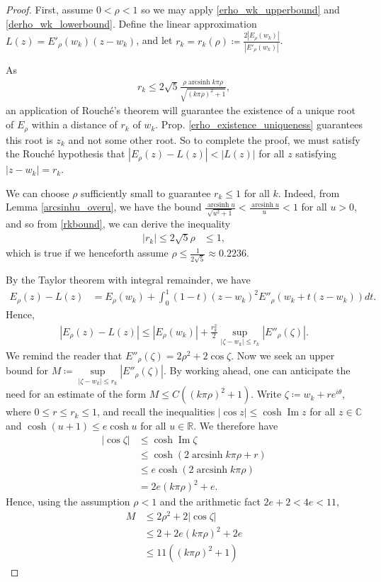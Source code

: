 \documentclass{amsart}
\theoremstyle{plain}
\numberwithin{theorem}{section}
\DeclareMathOperator{\arcsinh}{arcsinh}
\DeclareMathOperator{\Imz}{Im}
\theoremstyle{definition}
\theoremstyle{remark}
\theoremstyle{brakets}
\newcommand{\R}{\mathbb{R}}
\newcommand{\C}{\mathbb{C}}
\begin{document}
\begin{proof}
First, assume $0 < \rho < 1$ so we may apply \eqref{erho_wk_upperbound} and \eqref{derho_wk_lowerbound}. Define the linear approximation $L(z) = E'_\rho(w_k)(z-w_k)$, and let $r_k = r_k(\rho) \coloneq \frac{2|E_\rho(w_k)|}{|E'_\rho(w_k)|}$.

As 
\begin{align}
    r_k \leq 2\sqrt{5} \frac{\rho \arcsinh k \pi\rho}{\sqrt{(k\pi\rho)^2 + 1}}, \label{rkbound}
\end{align}
an application of Rouch\'e's theorem will guarantee the existence of a unique root of $E_\rho$ within a distance of $r_k$ of $w_k$. Prop. \ref{erho_existence_uniqueness} guarantees this root is $z_k$ and not some other root. So to complete the proof, we must satisfy the Rouch\'e hypothesis that $|E_\rho(z) - L(z) | < |L(z)|$ for all $z$ satisfying $|z-w_k| = r_k$.

We can choose $\rho$ sufficiently small to guarantee $r_k \leq 1$ for all $k$. Indeed, from Lemma \ref{arcsinhu_overu}, we have the bound $\frac{\arcsinh u}{\sqrt{u^2 + 1}} < \frac{\arcsinh u}{u} < 1$ for all $u > 0$, and so from \eqref{rkbound}, we can derive the inequality
\begin{align*}
    |r_k| \leq 2\sqrt{5}\rho &\leq 1,
\end{align*}
which is true if we henceforth assume $\rho \leq \frac{1}{2\sqrt{5}} \approx 0.2236$.

By the Taylor theorem with integral remainder, we have
\begin{align*}
    E_\rho(z) - L(z) &= E_\rho(w_k) + \int_0^1 (1-t)(z-w_k)^2 E''_\rho(w_k + t(z-w_k))dt.
\end{align*}
Hence,
\begin{align} \label{rouchetaylor}
    |E_\rho(z) - L(z)| \leq |E_\rho(w_k)| + \frac{r_k^2}{2} \sup\limits_{|\zeta - w_k| \leq r_k} |E''_\rho(\zeta)|.
\end{align}
We remind the reader that $E''_\rho(\zeta) = 2\rho^2 + 2\cos \zeta$. Now we seek an upper bound for $M \coloneq \sup\limits_{|\zeta - w_k| \leq r_k} |E''_\rho(\zeta)|$. By working ahead, one can anticipate the need for an estimate of the form $M \leq C((k\pi\rho)^2 + 1).$
Write $\zeta \coloneq w_k + re^{i\theta}$, where $0 \leq r \leq r_k \leq 1$, and recall the inequalities $\left|\cos z\right| \leq \cosh \Imz z $ for all $z\in \C$ and $\cosh(u+1) \leq e\cosh u$ for all $u \in \R$. We therefore have
\begin{align*}
    \left| \cos \zeta \right| &\leq \cosh \Imz \zeta \\
    &\leq \cosh (2\arcsinh k\pi\rho + r) \\
    &\leq e\cosh(2\arcsinh k \pi \rho) \\
    &= 2e(k\pi\rho)^2 + e.
\end{align*}
Hence, using the assumption $\rho < 1$ and the arithmetic fact $2e + 2 <4e < 11$,
\begin{align}
    M &\leq 2\rho^2 + 2\left|\cos \zeta \right| \nonumber \\
    &\leq 2 + 2e(k\pi\rho)^2 + 2e \nonumber \\
    &\leq 11((k\pi\rho)^2 + 1) \label{Mbound}
\end{align}


\end{proof}
\end{document}
